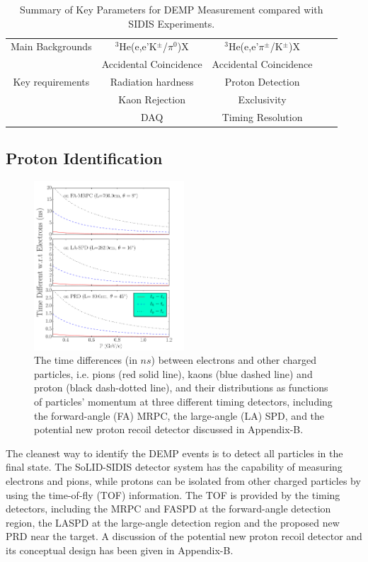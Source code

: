 \begin{table}
\begin{tabular}{|c|c|c|c|c|}
Main Backgrounds           & $\mathrm{^{3}He}$(e,e'K$^\pm$/$\pi^{0}$)X            &$\mathrm{^{3}He}$(e,e'$\pi^{\pm}$/K$^\pm$)X  \\
                           &   Accidental Coincidence & Accidental Coincidence	\\\hline
Key requirements           &  Radiation hardness      & Proton Detection	\\
                           &  Kaon Rejection          & Exclusivity	\\
                           &  DAQ                     &    Timing Resolution   \\
                        \hline
\end{tabular}
\caption{\footnotesize{Summary of Key Parameters for DEMP Measurement compared
    with SIDIS Experiments.}}\label{table:program_summary}
\label{table:key_par_sidis_dvcs}
\end{table} 

\newpage
\subsection{Proton Identification}
\begin{figure}[!ht]
 \begin{center}
  \includegraphics[width=0.5\textwidth]{./figures/time_diff.pdf}
   \caption[Time-of-time]{\footnotesize{The time differences (in $ns$) between electrons and other charged particles, i.e. pions (red solid line), kaons (blue dashed line) and proton (black dash-dotted line), and their distributions as functions of particles' momentum at three different timing detectors, including the forward-angle (FA) MRPC, the large-angle (LA) SPD, and the potential new proton recoil detector discussed in Appendix-B.}}
   \label{tof_diff}
 \end{center}
\end{figure}
The cleanest way to identify the DEMP events is to detect all particles in the final state. The SoLID-SIDIS detector system has the capability of measuring electrons and pions, while protons can be isolated from other charged particles by using the time-of-fly (TOF) information. The TOF is provided by the timing detectors, including the MRPC and FASPD at the forward-angle detection region, the LASPD at the large-angle detection region and the proposed new PRD near the target. A discussion of the potential new proton recoil detector and its conceptual design has been given in Appendix-B.

